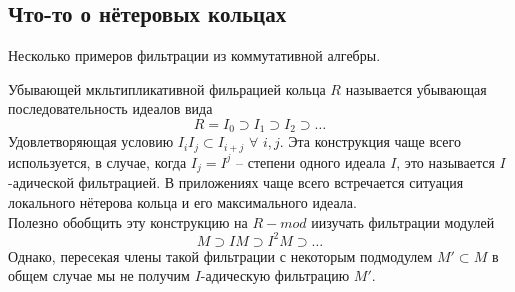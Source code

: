 \documentclass[../main.tex]{subfiles}
\begin{document}
\subsection{Что-то о нётеровых кольцах}
Несколько примеров фильтрации из коммутативной алгебры.
\begin{to_ex}
Убывающей мкльтипликативной фильрацией кольца $R$ называется убывающая последовательность идеалов вида 
\[
R = I_0 \supset I_1 \supset I_2 \supset \ldots
\]
Удовлетворяющая условию $I_i I_j \subset I_{i+j}$ $\forall$ $i, j$.
Эта конструкция чаще всего используется, в случае, когда $I_j = I^j$ -- степени одного идеала $I$, это называется $I$-адической фильтрацией. В приложениях чаще всего встречается ситуация локального нётерова кольца 
 и его максимального идеала.\\
 Полезно обобщить эту конструкцию на $R-mod$  иизучать фильтрации модулей
 \[M \supset IM \supset I^2 M \supset \ldots\]
 Однако, пересекая члены такой фильтрации с некоторым подмодулем $M' \subset M$ в общем случае мы не получим $I$-адическую фильтрацию $M'$.
\end{to_ex}
\end{document}
